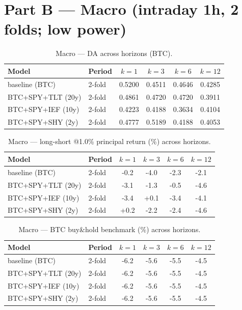 \documentclass[11pt]{article}
\begin{document}
\section*{Part B --- Macro (intraday 1h, 2 folds; low power)}
\begin{table}[h]\centering
\caption{Macro --- DA across horizons (BTC).}
\label{tab:mda}
\begin{tabular}{ll cccc}
\toprule
Model & Period & $k{=}1$ & $k{=}3$ & $k{=}6$ & $k{=}12$ \\
\midrule
baseline (BTC) & 2-fold & 0.5200 & 0.4511 & 0.4646 & 0.4285 \\
BTC+SPY+TLT (20y) & 2-fold & 0.4861 & 0.4720 & 0.4720 & 0.3911 \\
BTC+SPY+IEF (10y) & 2-fold & 0.4223 & 0.4188 & 0.3634 & 0.4104 \\
BTC+SPY+SHY (2y) & 2-fold & 0.4777 & 0.5189 & 0.4188 & 0.4053 \\
\bottomrule\end{tabular}\end{table}
\begin{table}[h]\centering
\caption{Macro --- long-short @1.0\% principal return (\%) across horizons.}
\label{tab:mret}
\begin{tabular}{ll cccc}
\toprule
Model & Period & $k{=}1$ & $k{=}3$ & $k{=}6$ & $k{=}12$ \\
\midrule
baseline (BTC) & 2-fold & -0.2 & -4.0 & -2.3 & -2.1 \\
BTC+SPY+TLT (20y) & 2-fold & -3.1 & -1.3 & -0.5 & -4.6 \\
BTC+SPY+IEF (10y) & 2-fold & -3.4 & +0.1 & -3.4 & -4.1 \\
BTC+SPY+SHY (2y) & 2-fold & +0.2 & -2.2 & -2.4 & -4.6 \\
\bottomrule\end{tabular}\end{table}
\begin{table}[h]\centering
\caption{Macro --- BTC buy\&hold benchmark (\%) across horizons.}
\label{tab:mbench}
\begin{tabular}{ll cccc}
\toprule
Model & Period & $k{=}1$ & $k{=}3$ & $k{=}6$ & $k{=}12$ \\
\midrule
baseline (BTC) & 2-fold & -6.2 & -5.6 & -5.5 & -4.5 \\
BTC+SPY+TLT (20y) & 2-fold & -6.2 & -5.6 & -5.5 & -4.5 \\
BTC+SPY+IEF (10y) & 2-fold & -6.2 & -5.6 & -5.5 & -4.5 \\
BTC+SPY+SHY (2y) & 2-fold & -6.2 & -5.6 & -5.5 & -4.5 \\
\bottomrule\end{tabular}\end{table}
\end{document}
